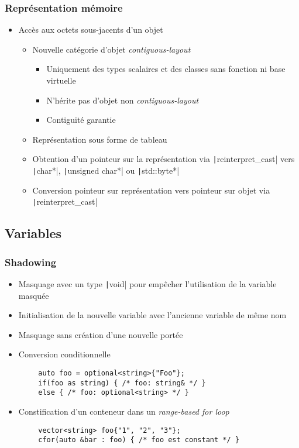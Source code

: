 \documentclass[C++.tex]{subfiles}
\begin{document}
\begin{frame}[fragile]
	\frametitle{Représentation mémoire}
	\begin{itemize}
		\item Accès aux octets sous-jacents d'un objet
		\begin{itemize}
			\item Nouvelle catégorie d'objet \textit{contiguous-layout}
			\begin{itemize}
				\item Uniquement des types scalaires et des classes sans fonction ni base virtuelle
				\item N'hérite pas d'objet non \textit{contiguous-layout}
				\item Contiguïté garantie
			\end{itemize}
			\item Représentation sous forme de tableau
			\item Obtention d'un pointeur sur la représentation via \texttt|reinterpret_cast| vers \texttt|char*|, \texttt|unsigned char*| ou \texttt|std::byte*|
			\item Conversion pointeur sur représentation vers pointeur sur objet via \texttt|reinterpret_cast|
		\end{itemize}
	\end{itemize}
\end{frame}

\subsection*{Variables}
\begin{frame}[fragile]
	\frametitle{Shadowing}
	\begin{itemize}
		\item Masquage avec un type \texttt|void| pour empêcher l'utilisation de la variable masquée
		\item Initialisation de la nouvelle variable avec l'ancienne variable de même nom
		\item Masquage sans création d'une nouvelle portée
		\item Conversion conditionnelle
	\end{itemize}

	\begin{verbatim}
		auto foo = optional<string>{"Foo"};
		if(foo as string) { /* foo: string& */ }
		else { /* foo: optional<string> */ }
	\end{verbatim}

	\begin{itemize}
		\item Constification d'un conteneur dans un \textit{range-based for loop}
	\end{itemize}

	\begin{verbatim}
		vector<string> foo{"1", "2", "3"};
		cfor(auto &bar : foo) { /* foo est constant */ }
	\end{verbatim}

\end{frame}
\end{document}
